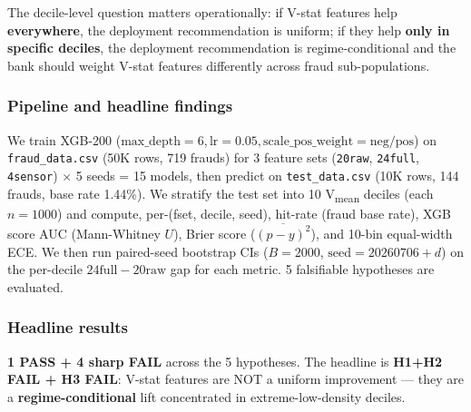 \documentclass{article}
\begin{document}
The decile-level question matters operationally: if V-stat features help
\textbf{everywhere}, the deployment recommendation is uniform; if they help
\textbf{only in specific deciles}, the deployment recommendation is
regime-conditional and the bank should weight V-stat features differently
across fraud sub-populations.

\subsubsection{Pipeline and headline findings}\label{sec:p8-iter192-pipeline}
We train XGB-200 ($\mathrm{max\_depth}{=}6, \mathrm{lr}{=}0.05,
\mathrm{scale\_pos\_weight}{=}\mathrm{neg}/\mathrm{pos}$) on
\texttt{fraud\_data.csv} (50K rows, 719 frauds) for 3 feature sets
(\texttt{20raw}, \texttt{24full}, \texttt{4sensor}) $\times$ 5 seeds = 15
models, then predict on \texttt{test\_data.csv} (10K rows, 144 frauds,
base rate 1.44\%). We stratify the test set into 10 V\textsubscript{mean}
deciles (each $n{=}1000$) and compute, per-(fset, decile, seed),
hit-rate (fraud base rate), XGB score AUC (Mann-Whitney $U$), Brier score
($\overline{(p-y)^2}$), and 10-bin equal-width ECE. We then run
paired-seed bootstrap CIs ($B{=}2000$, $\mathrm{seed}{=}20260706{+}d$)
on the per-decile $24\mathrm{full}{-}20\mathrm{raw}$ gap for each metric.
5 falsifiable hypotheses are evaluated.

\subsubsection{Headline results}\label{sec:p8-iter192-results}
\textbf{1 PASS + 4 sharp FAIL} across the 5 hypotheses. The headline is
\textbf{H1+H2 FAIL + H3 FAIL}: V-stat features are NOT a uniform
improvement — they are a \textbf{regime-conditional} lift concentrated
in extreme-low-density deciles.
\end{document}
